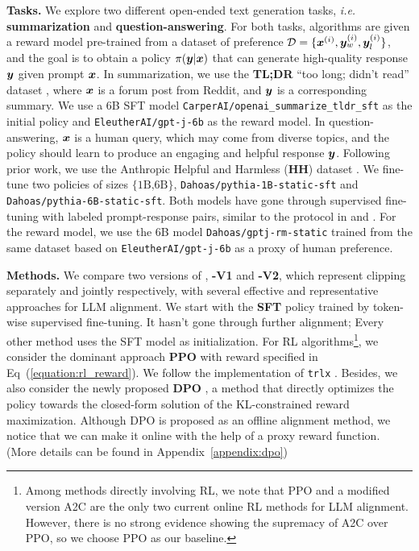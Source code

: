 \documentclass{article} %
\newcommand{\algn}{\text{P3O}}
\begin{document}
\textbf{Tasks.} We explore two different open-ended text generation tasks, \textit{i.e.} \textbf{summarization} and \textbf{question-answering}. For both tasks, algorithms are given a reward model pre-trained from a dataset of preference $\mathcal{D}=\{{\bm{x}}^{(i)},{\bm{y}}_w^{(i)},{\bm{y}}_l^{(i)}\}$, and the goal is to obtain a policy $\pi({\bm{y}}|{\bm{x}})$ that can generate high-quality response ${\bm{y}}$ given prompt ${\bm{x}}$. In summarization, we use the \textbf{TL;DR} ``too long; didn't read'' dataset \citep{volske2017tl}, where ${\bm{x}}$ is a forum post from Reddit, and ${\bm{y}}$ is a corresponding summary. We use a 6B SFT model \texttt{CarperAI/openai\_summarize\_tldr\_sft} as the initial policy and \texttt{EleutherAI/gpt-j-6b} as the reward model.
In question-answering, ${\bm{x}}$ is a human query, which may come from diverse topics, and the policy should learn to produce an engaging and helpful response ${\bm{y}}$. Following prior work, we use the Anthropic Helpful and Harmless (\textbf{HH}) dataset \citep{bai2022training}. We fine-tune two policies of sizes $\{\text{1B,6B}\}$, \texttt{Dahoas/pythia-1B-static-sft} and \texttt{Dahoas/pythia-6B-static-sft}. Both models have gone through supervised fine-tuning with labeled prompt-response pairs, similar to the protocol in \citet{ouyang2022training} and \citet{ramamurthy2022reinforcement}. For the reward model, we use the 6B model \texttt{Dahoas/gptj-rm-static} trained from the same dataset based on \texttt{EleutherAI/gpt-j-6b} as a proxy of human preference.

\textbf{Methods.} We compare two versions of \algn, \textbf{\algn-V1} and \textbf{\algn-V2}, which represent clipping separately and jointly respectively, with several effective and representative approaches for LLM alignment. We start with the \textbf{SFT} policy trained by token-wise supervised fine-tuning. 
It hasn't gone through further alignment; Every other method uses the SFT model as initialization. 
For RL algorithms\footnote{Among methods directly involving RL, we note that PPO and a modified version A2C \citep{mnih2016asynchronous,lee2023rlaif} are the only two current online RL methods for LLM alignment. However, there is no strong evidence showing the supremacy of A2C over PPO, so we choose PPO as our baseline.}, we consider the dominant approach \textbf{PPO} \citep{schulman2017proximal,ouyang2022training} with reward specified in Eq~(\ref{equation:rl_reward}).  We follow the implementation of \texttt{trlx} \citep{trlx-library}. 
Besides, we also consider the newly proposed \textbf{DPO} \citep{rafailov2023direct}, a method that directly optimizes the policy towards the closed-form solution of the KL-constrained reward maximization. Although DPO is proposed as an offline alignment method, we notice that we can make it online with the help of a proxy reward function. (More details can be found in Appendix~\ref{appendix:dpo})
\end{document}
